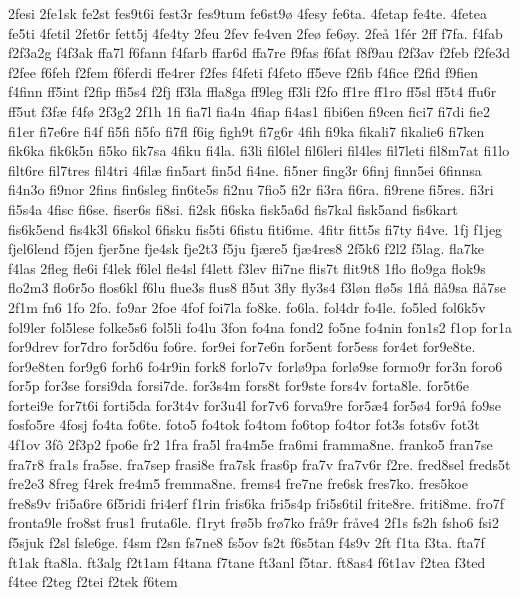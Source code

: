 {2fesi
2fe1sk
fe2st
fes9t6i
fest3r
fes9tum
fe6st9^^f8
4fesy
fe6ta.
4fetap
fe4te.
4fetea
fe5ti
4fetil
2fet6r
fett5j
4fe4ty
2feu
2fev
fe4ven
2fe^^f8
fe6^^f8y.
2fe^^e5
1f^^e9r
2ff
f7fa.
f4fab
f2f3a2g
f4f3ak
ffa7l
f6fann
f4farb
ffar6d
ffa7re
f9fas
f6fat
f8f9au
f2f3av
f2feb
f2fe3d
f2fee
f6feh
f2fem
f6ferdi
ffe4rer
f2fes
f4feti
f4feto
ff5eve
f2fib
f4fice
f2fid
f9fien
f4finn
ff5int
f2fip
ffi5s4
f2fj
ff3la
ffla8ga
ff9leg
ff3li
f2fo
ff1re
ff1ro
ff5sl
ff5t4
ffu6r
ff5ut
f3f^^e6
f4f^^f8
2f3g2
2f1h
1fi
fia7l
fia4n
4fiap
fi4as1
fibi6en
fi9cen
fici7
fi7di
fie2
fi1er
fi7e6re
fi4f
fi5fi
fi5fo
fi7fl
f6ig
figh9t
fi7g6r
4fih
fi9ka
fikali7
fikalie6
fi7ken
fik6ka
fik6k5n
fi5ko
fik7sa
4fiku
fi4la.
fi3li
fil6lel
fil6leri
fil4les
fil7leti
fil8m7at
fi1lo
filt6re
fil7tres
fil4tri
4fil^^e6
fin5art
fin5d
fi4ne.
fi5ner
fing3r
6finj
finn5ei
6finnsa
fi4n3o
fi9nor
2fins
fin6sleg
fin6te5s
fi2nu
7fio5
fi2r
fi3ra
fi6ra.
fi9rene
fi5res.
fi3ri
fi5s4a
4fisc
fi6se.
fiser6s
fi8si.
fi2sk
fi6ska
fisk5a6d
fis7kal
fisk5and
fis6kart
fis6k5end
fis4k3l
6fiskol
6fisku
fis5ti
6fistu
fiti6me.
4fitr
fitt5s
fi7ty
fi4ve.
1fj
f1jeg
fjel6lend
f5jen
fjer5ne
fje4sk
fje2t3
f5ju
fj^^e6re5
fj^^e64res8
2f5k6
f2l2
f5lag.
fla7ke
f4las
2fleg
fle6i
f4lek
f6lel
fle4sl
f4lett
f3lev
fli7ne
flis7t
flit9t8
1flo
flo9ga
flok9s
flo2m3
flo6r5o
flos6kl
f6lu
flue3s
flus8
fl5ut
3fly
fly3s4
f3l^^f8n
fl^^f85s
1fl^^e5
fl^^e59sa
fl^^e57se
2f1m
fn6
1fo
2fo.
fo9ar
2foe
4fof
foi7la
fo8ke.
fo6la.
fol4dr
fo4le.
fo5led
fol6k5v
fol9ler
fol5lese
folke5s6
fol5li
fo4lu
3fon
fo4na
fond2
fo5ne
fo4nin
fon1s2
f1op
for1a
for9drev
for7dro
for5d6u
fo6re.
for9ei
for7e6n
for5ent
for5ess
for4et
for9e8te.
for9e8ten
for9g6
forh6
fo4r9in
fork8
forlo7v
forl^^f89pa
forl^^f89se
formo9r
for3n
foro6
for5p
for3se
forsi9da
forsi7de.
for3s4m
fors8t
for9ste
fors4v
forta8le.
for5t6e
fortei9e
for7t6i
forti5da
for3t4v
for3u4l
for7v6
forva9re
for5^^e64
for5^^f84
for9^^e5
fo9se
fosfo5re
4fosj
fo4ta
fo6te.
foto5
fo4tok
fo4tom
fo6top
fo4tor
fot3s
fots6v
fot3t
4f1ov
3f^^f4
2f3p2
fpo6e
fr2
1fra
fra5l
fra4m5e
fra6mi
framma8ne.
franko5
fran7se
fra7r8
fra1s
fra5se.
fra7sep
frasi8e
fra7sk
fras6p
fra7v
fra7v6r
f2re.
fred8sel
freds5t
fre2e3
8freg
f4rek
fre4m5
fremma8ne.
frems4
fre7ne
fre6sk
fres7ko.
fres5koe
fre8s9v
fri5a6re
6f5ridi
fri4erf
f1rin
fris6ka
fri5s4p
fri5s6til
frite8re.
friti8me.
fro7f
fronta9le
fro8st
frus1
fruta6le.
f1ryt
fr^^f85b
fr^^f87ko
fr^^e59r
fr^^e5ve4
2f1s
fs2h
fsho6
fsi2
f5sjuk
f2sl
fsle6ge.
f4sm
f2sn
fs7ne8
fs5ov
fs2t
f6s5tan
f4s9v
2ft
f1ta
f3ta.
fta7f
ft1ak
fta8la.
ft3alg
f2t1am
f4tana
f7tane
ft3anl
f5tar.
ft8as4
f6t1av
f2tea
f3ted
f4tee
f2teg
f2tei
f2tek
f6tem
}
